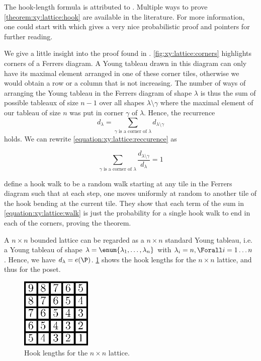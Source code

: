The hook-length formula is attributed to \citet*{frame:1954}. Multiple ways to
prove \ref{theorem:xy:lattice:hook} are available in the literature. For more
information, one could start with \citet*{greene:1979} which gives a very nice
probabilistic proof and pointers for further reading.

We give a little insight into the proof found in \citet*{greene:1979}.
\ref{fig:xy:lattice:corners} highlights corners of a Ferrers diagram. A Young
tableau drawn in this diagram can only have its maximal element arranged in
one of these corner tiles, otherwise we would obtain a row or a column that is
not increasing. The number of ways of arranging the Young tableau in the
Ferrers diagram of shape \(\lambda\) is thus the sum of possible tableaux of
size \(n-1\) over all shapes \(\lambda \setminus \gamma\) where the maximal
element of our tableau of size \(n\) was put in corner \(\gamma\) of
\(\lambda\). Hence, the recurrence
\begin{equation}\label{equation:xy:lattice:reccurence}
d_{\lambda} = \sum_{\gamma \text{ is a corner of } \lambda} d_{\lambda
\setminus \gamma}
\end{equation}
holds. We can rewrite \ref{equation:xy:lattice:reccurence} as

\begin{equation}\label{equation:xy:lattice:walk}
\sum_{\gamma \text{ is a corner of } \lambda} \frac{d_{\lambda
\setminus \gamma}}{d_{\lambda}} = 1
\end{equation}

\citet*{greene:1979} define a hook walk to be a random walk starting at
any tile in the Ferrers diagram such that at each step, one moves uniformly at
random to another tile of the hook bending at the current tile.
They show that each term of the sum in \ref{equation:xy:lattice:walk} is just
the probability for a single hook walk to end in each of the corners, proving
the theorem.

A \( n \times n \) bounded lattice can be regarded as a \( n \times n \)
standard Young tableau, i.e. a Young tableau of shape
\( \lambda = \enum{ \lambda_1 , \ldots , \lambda_n } \)
with
\( \lambda_i = n, \Forall i = 1 \ldots n \)
. Hence, we have
\( d_{\lambda} = e(\P) \). \ref{fig:xy:lattice:xyhooks} shows the hook lengths
for the \( n \times n \) lattice, and thus for the \XY poset.

\begin{figure}
\centering
\includegraphics[width=0.3\textwidth]{fig/x+y/lattice/xyhooks}
\caption{Hook lengths for the \( n \times n \) lattice.}
\label{fig:xy:lattice:xyhooks}
\end{figure}

